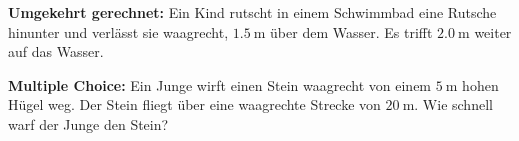 \documentclass[addpoints,11pt,a4paper]{exam}
\newlength{\antwortraumlen}
\newcommand{\Antwortraum}[1]{%
  \pgfmathsetlength{\antwortraumlen}{#1*2.5cm}%
  \begin{answerbox}
    \rule{0pt}{\antwortraumlen}%
  \end{answerbox}%
}
\begin{document}
\begin{questions}
\begin{taskbox}
\question[6] \textbf{Umgekehrt gerechnet:} Ein Kind rutscht in einem
Schwimmbad eine Rutsche hinunter und verlässt sie waagrecht,
$\SI{1.5}{\meter}$ über dem Wasser. Es trifft $\SI{2.0}{\meter}$ weiter
auf das Wasser.


\question[3] \textbf{Multiple Choice:} Ein Junge wirft einen Stein
waagrecht von einem $\SI{5}{\meter}$ hohen Hügel weg. Der Stein fliegt
über eine waagrechte Strecke von $\SI{20}{\meter}$. Wie schnell warf der
Junge den Stein?

\begin{parts}

\end{parts}
\end{taskbox}
\end{questions}
\end{document}
